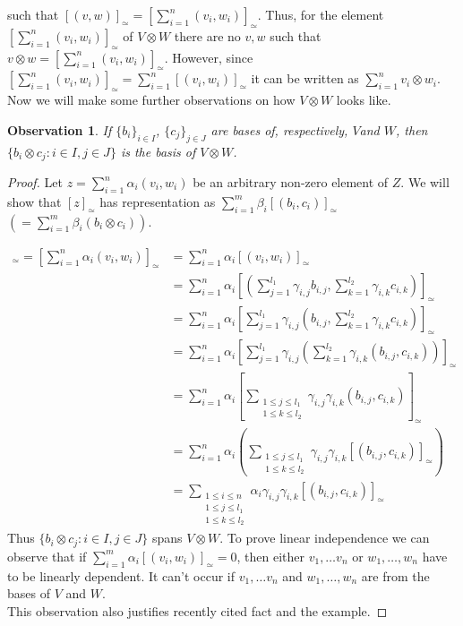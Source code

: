 \documentclass[a4paper, 12pt]{report}
\newtheorem{observation}{Observation}
\begin{document}
such that $ [(v,w)]_\simeq = \left[\displaystyle\sum^n_{i=1}(v_i,w_i)\right]_\simeq$.
Thus, for the element $\left[\displaystyle\sum^n_{i=1}(v_i,w_i)\right]_\simeq$ of $V\otimes W$
there are no $v, w$ such that $v \otimes w = \left[\displaystyle\sum^n_{i=1}(v_i,w_i)\right]_\simeq$.
However, since $\left[\displaystyle\sum^n_{i=1}(v_i,w_i)\right]_\simeq =
\displaystyle\sum^n_{i=1}[(v_i,w_i)]_\simeq$ it can be written as
$\displaystyle\sum^n_{i=1}v_i \otimes w_i$. \\
Now we will make some further observations on how $V \otimes W$ looks like.
\begin{observation}
\label{observation:1}
If $\{b_i\}_{i \in I}$, $\{c_j\}_{j \in J}$ are bases of, respectively, $V$and $W$,
then $\{b_i \otimes c_j : i \in I, j \in J\}$ is the basis of $V \otimes W$.
\end{observation}
\begin{proof}
Let $z = \displaystyle\sum^n_{i = 1}\alpha_i(v_i,w_i)$ be an arbitrary non-zero element of $Z$. We will show
that $[z]_\simeq$ has representation as $\displaystyle\sum^m_{i = 1}\beta_i [(b_i,c_i)]_\simeq$
$\left(=\displaystyle\sum^m_{i = 1}\beta_i(b_i \otimes c_i)\right)$.

\begin{align*}
[z]_\simeq = \left[\sum^n_{i = 1}\alpha_i(v_i,w_i)\right]_\simeq &=
\sum^n_{i = 1}\alpha_i[(v_i,w_i)]_\simeq \\
&= \sum^n_{i = 1}\alpha_i\left[\left(\sum^{l_1}_{j=1}\gamma_{i,j}b_{i,j},
\sum^{l_2}_{k=1}\gamma_{i,k}c_{i,k}\right)\right]_\simeq \\
&= \sum^n_{i = 1}\alpha_i\left[\sum^{l_1}_{j=1}\gamma_{i,j}\left(b_{i,j},
\sum^{l_2}_{k=1}\gamma_{i,k}c_{i,k}\right)\right]_\simeq \\
&= \sum^n_{i = 1}\alpha_i\left[\sum^{l_1}_{j=1}\gamma_{i,j}\left(\sum^{l_2}_{k=1}\gamma_{i,k}
\left(b_{i,j},c_{i,k}\right)\right)\right]_\simeq \\
&= \sum^n_{i = 1}\alpha_i\left[\sum_{\substack{1 \leq j \leq l_1 \\ 1 \leq k \leq l_2}}
\gamma_{i,j}\gamma_{i,k}(b_{i,j}, c_{i,k})\right]_\simeq \\
&= \sum^n_{i = 1}\alpha_i\left(\sum_{\substack{1 \leq j \leq l_1 \\ 1 \leq k \leq l_2}}
\gamma_{i,j}\gamma_{i,k}[(b_{i,j}, c_{i,k})]_\simeq\right) \\
&= \sum_{\substack{1 \leq i \leq n \\1 \leq j \leq l_1 \\ 1 \leq k \leq l_2}}
\alpha_i\gamma_{i,j}\gamma_{i,k}[(b_{i,j}, c_{i,k})]_\simeq
\end{align*}
Thus $\{b_i \otimes c_j : i \in I, j \in J\}$ spans $V \otimes W$. To prove linear independence we can
observe that if $\displaystyle\sum^m_{i = 1}\alpha_i [(v_i,w_i)]_\simeq = 0$,
then either $v_1, \dots v_n$ or $w_1, \dots, w_n$ have to be linearly dependent. It can't occur if
$v_1, \dots v_n$ and $w_1, \dots, w_n$ are from the bases of $V$ and $W$.\\
This observation also justifies
recently cited fact and the example.
\end{proof}
\end{document}
